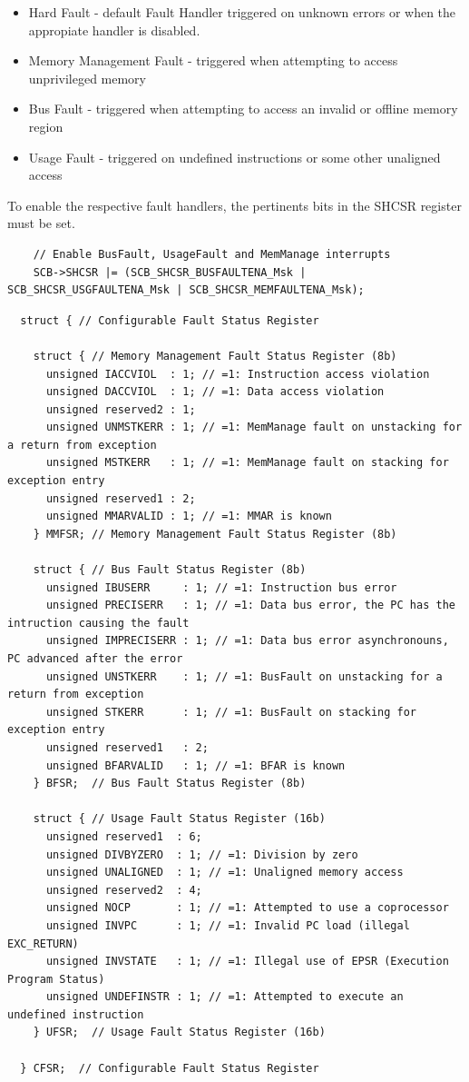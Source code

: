 \begin{itemize}
    \item Hard Fault - default Fault Handler triggered on unknown errors or when the appropiate handler is disabled.
    \item Memory Management Fault - triggered when attempting to access unprivileged memory
    \item Bus Fault - triggered when attempting to access an invalid or offline memory region
    \item Usage Fault - triggered on undefined instructions or some other unaligned access
\end{itemize}

To enable the respective fault handlers, the pertinents bits in the SHCSR register must be set.

\begin{lstlisting}
    // Enable BusFault, UsageFault and MemManage interrupts
    SCB->SHCSR |= (SCB_SHCSR_BUSFAULTENA_Msk | SCB_SHCSR_USGFAULTENA_Msk | SCB_SHCSR_MEMFAULTENA_Msk);
\end{lstlisting}

\newpage

\begin{lstlisting}
  struct { // Configurable Fault Status Register

    struct { // Memory Management Fault Status Register (8b)
      unsigned IACCVIOL  : 1; // =1: Instruction access violation
      unsigned DACCVIOL  : 1; // =1: Data access violation
      unsigned reserved2 : 1;
      unsigned UNMSTKERR : 1; // =1: MemManage fault on unstacking for a return from exception
      unsigned MSTKERR   : 1; // =1: MemManage fault on stacking for exception entry
      unsigned reserved1 : 2;
      unsigned MMARVALID : 1; // =1: MMAR is known
    } MMFSR; // Memory Management Fault Status Register (8b)

    struct { // Bus Fault Status Register (8b)
      unsigned IBUSERR     : 1; // =1: Instruction bus error
      unsigned PRECISERR   : 1; // =1: Data bus error, the PC has the intruction causing the fault
      unsigned IMPRECISERR : 1; // =1: Data bus error asynchronouns, PC advanced after the error
      unsigned UNSTKERR    : 1; // =1: BusFault on unstacking for a return from exception
      unsigned STKERR      : 1; // =1: BusFault on stacking for exception entry
      unsigned reserved1   : 2;
      unsigned BFARVALID   : 1; // =1: BFAR is known
    } BFSR;  // Bus Fault Status Register (8b)

    struct { // Usage Fault Status Register (16b)
      unsigned reserved1  : 6;
      unsigned DIVBYZERO  : 1; // =1: Division by zero
      unsigned UNALIGNED  : 1; // =1: Unaligned memory access
      unsigned reserved2  : 4;
      unsigned NOCP       : 1; // =1: Attempted to use a coprocessor
      unsigned INVPC      : 1; // =1: Invalid PC load (illegal EXC_RETURN)
      unsigned INVSTATE   : 1; // =1: Illegal use of EPSR (Execution Program Status)
      unsigned UNDEFINSTR : 1; // =1: Attempted to execute an undefined instruction
    } UFSR;  // Usage Fault Status Register (16b)

  } CFSR;  // Configurable Fault Status Register
\end{lstlisting}



